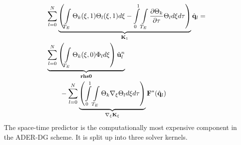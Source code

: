 \documentclass{acm_proc_article-sp}
\begin{document}
\begin{align}
\begin{split}
&\sum \limits_{l=0}^N \underbrace{\left( \int \limits_{T_E} \Theta_k(\xi,1) \Theta_l(\xi,1) d\xi - \int \limits_{0}^{1} \int \limits_{T_E} \frac{\partial \Theta_k}{\partial \tau} \Theta_l d\xi d\tau \right)}_{\mathbf{K}_1} \hat{\mathbf{q}}_l = \\
&\underbrace{\sum \limits_{l=0}^N \left( \int \limits_{T_E} \Theta_k(\xi,0) \Phi_l d\xi\right) \hat{\mathbf{u}}_l^n}_{\text{\textbf{rhs0}}} \\
&\qquad - \sum \limits_{l=0}^N \underbrace{\left( \int \limits_{0}^1 \int \limits_{T_E} \Theta_k \nabla_{\mathbf{\xi}}  \Theta_l d\mathbf{\xi} d\tau \right)}_{\nabla_{\mathbf{\xi}} \mathbf{K}_{\xi}} \mathbf{F}^*(\hat{\mathbf{q}}_l)\label{eq:final}
\end{split}
\end{align}
The space-time predictor is the computationally most expensive component in the ADER-DG scheme. It is split up into three solver kernels.
\end{document}
